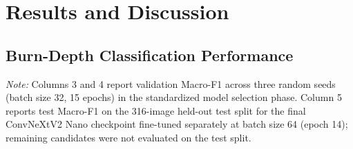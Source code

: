 \documentclass[11pt,a4paper]{article}
\begin{document}
\section{Results and Discussion}

\subsection{Burn-Depth Classification Performance}

\begin{table}[H]
\centering
\caption{Classification candidate performance across three random seeds in model selection.}
\label{tab:table5}
\small
{}
\vspace{0.3ex}
\flushleft
\footnotesize\textit {Note:} Columns 3 and 4 report validation Macro-F1 across three random seeds (batch size 32, 15 epochs) in the standardized model selection phase. Column 5 reports test Macro-F1 on the 316-image held-out test split for the final ConvNeXtV2 Nano checkpoint fine-tuned separately at batch size 64 (epoch 14); remaining candidates were not evaluated on the test split.
\end{table}
\end{document}
